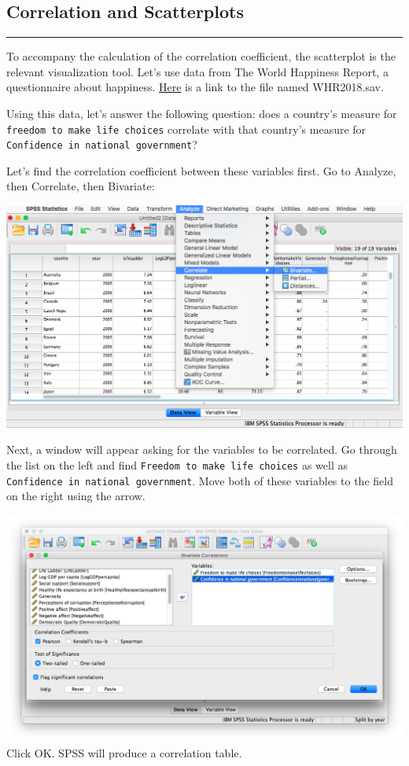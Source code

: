 \documentclass[
]{book}
\begin{document}
\hypertarget{correlation-and-scatterplots}{%
\subsection{Correlation and Scatterplots}\label{correlation-and-scatterplots}}

\begin{center}\rule{0.5\linewidth}{0.5pt}\end{center}

To accompany the calculation of the correlation coefficient, the scatterplot is the relevant visualization tool. Let's use data from The World Happiness Report, a questionnaire about happiness. \href{https://github.com/CrumpLab/statisticsLab/blob/master/data/spssdata/WHR2018.sav}{Here} is a link to the file named WHR2018.sav.

Using this data, let's answer the following question: does a country's measure for \texttt{freedom\ to\ make\ life\ choices} correlate with that country's measure for \texttt{Confidence\ in\ national\ government}?

Let's find the correlation coefficient between these variables first. Go to {Analyze}, then {Correlate}, then {Bivariate}:

\includegraphics{img/3.4.19.png}

Next, a window will appear asking for the variables to be correlated. Go through the list on the left and find \texttt{Freedom\ to\ make\ life\ choices} as well as \texttt{Confidence\ in\ national\ government}. Move both of these variables to the field on the right using the arrow.

\includegraphics{img/3.4.20.png}
Click OK. SPSS will produce a correlation table.
\end{document}
